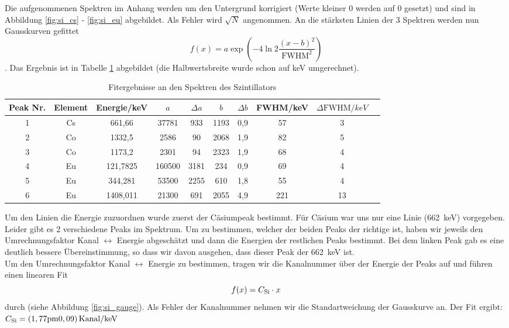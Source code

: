 Die aufgenommenen Spektren im Anhang werden um den Untergrund korrigiert (Werte kleiner 0 werden auf 0 gesetzt) und sind in Abbildung \ref{fig:si_cs} - \ref{fig:si_eu} abgebildet. Als Fehler wird $\sqrt{N}$ angenommen. An die stärksten Linien der 3 Spektren werden nun Gausskurven gefittet\[f(x) = a\exp{\left(-4\ln{2}\frac{(x-b)^2}{\text{FWHM}^2}\right)}\]. Das Ergebnis ist in Tabelle \ref{tab:si} abgebildet (die Halbwertsbreite wurde schon auf keV umgerechnet).

\begin{table}
\caption{Fitergebnisse an den Spektren des Szintillators}
\begin{tabular}{cccccccccc}
\toprule
Peak Nr. & Element & Energie/\si{keV}& $a$ & $\Delta a$ & $b$ & $\Delta b$ & FWHM/\si{keV} & $\Delta \text{FWHM}/\si{keV}$\\
\midrule 
1	&	Cs	&	661,66	&	37781	&	933	&	1193	&	0,9	&	57	&	3\\
2	&	Co	&	1332,5	&	2586	&	90	&	2068	&	1,9	&	82	&	5\\
3	&	Co	&	1173,2	&	2301	&	94	&	2323	&	1,9	&	68	&	4\\
4	&	Eu	&	121,7825	&	160500	&	3181	&	234	&	0,9	&	69	&	4\\
5	&	Eu	&	344,281	&	53500	&	2255	&	610	&	1,8	&	55	&	4\\
6	&	Eu	&	1408,011	&	21300	&	691	&	2055	&	4,9	&	221	&	13\\
\bottomrule
\end{tabular}
\label{tab:si}
\end{table}

Um den Linien die Energie zuzuordnen wurde zuerst der Cäsiumpeak bestimmt. Für Cäsium war uns nur eine Linie (\SI{662}{keV}) vorgegeben. Leider gibt es 2 verschiedene Peaks im Spektrum. Um zu bestimmen, welcher der beiden Peaks der richtige ist, haben wir jeweils den Umrechnungsfaktor Kanal $\leftrightarrow$ Energie abgeschätzt und dann die Energien der restlichen Peaks bestimmt. Bei dem linken Peak gab es eine deutlich bessere Übereinstimmung, so dass wir davon ausgehen, dass dieser Peak der \SI{662}{keV} ist.\\
Um den Umrechnungsfaktor Kanal $\leftrightarrow$ Energie zu bestimmen, tragen wir die Kanalnummer über der Energie der Peaks auf und führen einen linearen Fit \[f(x) = C\ind{Si}\cdot x\] durch (siehe Abbildung \ref{fig:si_gauge}). Als Fehler der Kanalnummer nehmen wir die Standartweichung der Gausskurve an. Der Fit ergibt: $C\ind{Si} = \si{(1,77\pm 0,09)\,Kanal/keV}$

